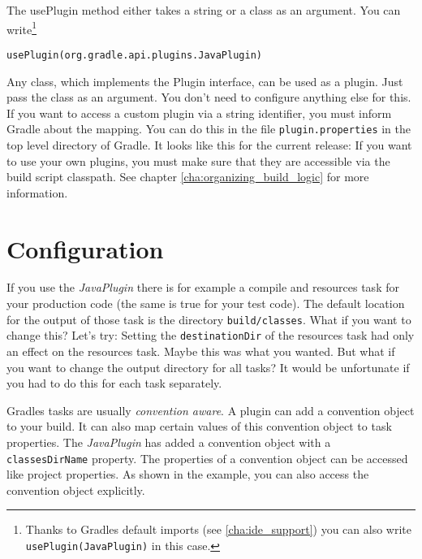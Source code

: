 \noindent The usePlugin method either takes a string or a class as an argument. You can write\footnote{Thanks to Gradles default imports (see \ref{cha:ide_support}) you can also write \texttt{usePlugin(JavaPlugin)} in this case.}
\begin{Verbatim}
usePlugin(org.gradle.api.plugins.JavaPlugin)
\end{Verbatim} 
Any class, which implements the Plugin interface, can be used as a plugin. Just pass the class as an argument. You don't need to configure anything else for this. If you want to access a custom plugin via a string identifier, you must inform Gradle about the mapping. You can do this in the file \texttt{plugin.properties} in the top level directory of Gradle. It looks like this for the current release:
If you want to use your own plugins, you must make sure that they are accessible via the build script classpath. See chapter \ref{cha:organizing_build_logic} for more information.

\section{Configuration} %
If you use the \emph{JavaPlugin} there is for example a compile and resources task for your production code (the same is true for your test code). The default location for the output of those task is the directory \texttt{build/classes}. What if you want to change this? Let's try:
Setting the \texttt{destinationDir} of the resources task had only an effect on the resources task. Maybe this was what you wanted. But what if you want to change the output directory for all tasks? It would be unfortunate if you had to do this for each task separately. 

Gradles tasks are usually \emph{convention aware}. A plugin can add a convention object to your build. It can also map certain values of this convention object to task properties.
The \emph{JavaPlugin} has added a convention object with a \texttt{classesDirName} property. The properties of a convention object can be accessed like project properties. As shown in the example, you can also access the convention object explicitly.

